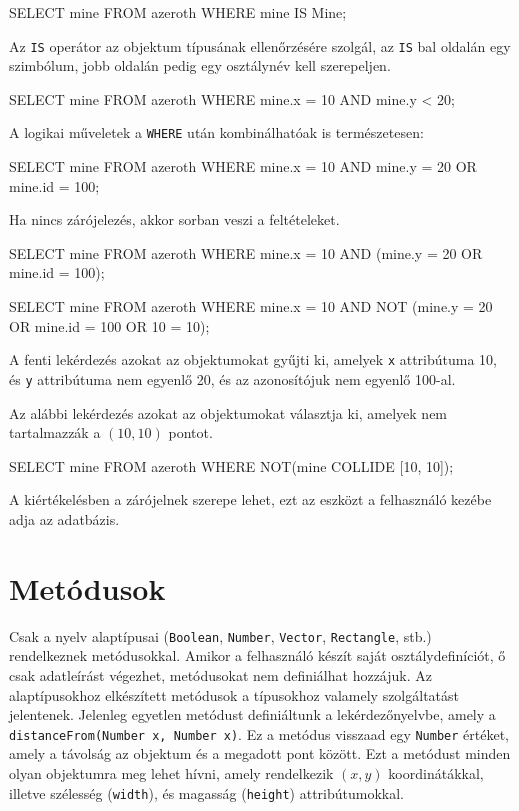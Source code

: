 \begin{sql}
SELECT mine FROM azeroth WHERE mine IS Mine;
\end{sql}

Az \texttt{IS} operátor az objektum típusának ellenőrzésére szolgál, az \texttt{IS} bal oldalán egy szimbólum, jobb oldalán pedig egy osztálynév kell szerepeljen.

\begin{sql}
SELECT mine FROM azeroth WHERE mine.x = 10 AND mine.y < 20;
\end{sql}

A logikai műveletek a \texttt{WHERE} után kombinálhatóak is természetesen:

\begin{sql}
SELECT mine FROM azeroth
WHERE mine.x = 10 AND mine.y = 20 OR mine.id = 100;
\end{sql}

Ha nincs zárójelezés, akkor sorban veszi a feltételeket.

\begin{sql}
SELECT mine FROM azeroth
WHERE mine.x = 10 AND (mine.y = 20 OR mine.id = 100);
\end{sql}

\begin{sql}
SELECT mine FROM azeroth
WHERE mine.x = 10 AND NOT (mine.y = 20 OR mine.id = 100 OR 10 = 10);
\end{sql}

A fenti lekérdezés azokat az objektumokat gyűjti ki, amelyek \texttt{x} attribútuma 10, és \texttt{y} attribútuma nem egyenlő 20, és az azonosítójuk nem egyenlő 100-al.

Az alábbi lekérdezés azokat az objektumokat választja ki, amelyek nem tartalmazzák a $(10, 10)$ pontot.
\begin{sql}
SELECT mine FROM azeroth
WHERE NOT(mine COLLIDE [10, 10]);
\end{sql}


A kiértékelésben a zárójelnek szerepe lehet, ezt az eszközt a felhasználó kezébe adja az adatbázis.

\section{Metódusok}

Csak a nyelv alaptípusai (\texttt{Boolean}, \texttt{Number}, \texttt{Vector}, \texttt{Rectangle}, stb.) rendelkeznek metódusokkal. Amikor a felhasználó készít saját osztálydefiníciót, ő csak adatleírást végezhet, metódusokat nem definiálhat hozzájuk. Az alaptípusokhoz elkészített metódusok a típusokhoz valamely szolgáltatást jelentenek. Jelenleg egyetlen metódust definiáltunk a lekérdezőnyelvbe, amely a \texttt{distanceFrom(Number x, Number x)}. Ez a metódus visszaad egy \texttt{Number} értéket, amely a távolság az objektum és a megadott pont között. Ezt a metódust minden olyan objektumra meg lehet hívni, amely rendelkezik $(x, y)$ koordinátákkal, illetve szélesség (\texttt{width}), és magasság (\texttt{height}) attribútumokkal.

